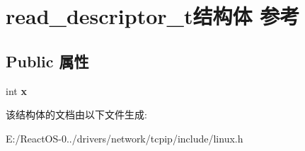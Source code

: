 \hypertarget{structread__descriptor__t}{}\section{read\+\_\+descriptor\+\_\+t结构体 参考}
\label{structread__descriptor__t}
\subsection*{Public 属性}
\begin{DoxyCompactItemize}
\item 
\mbox{\label{structread__descriptor__t_ae03b6c1d33407c5b303657345f63d612}} 
int {\bfseries x}
\end{DoxyCompactItemize}


该结构体的文档由以下文件生成\+:\begin{DoxyCompactItemize}
\item 
E\+:/\+React\+O\+S-\/0../drivers/network/tcpip/include/linux.\+h\end{DoxyCompactItemize}
